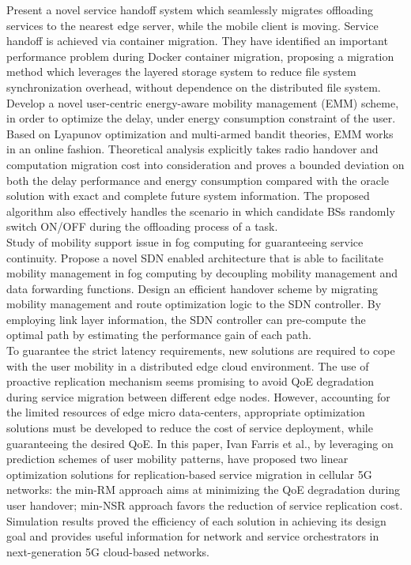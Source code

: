 \cite{ma2017efficient}
Present a novel service handoff system which seamlessly migrates offloading services to the nearest edge server, while the mobile client is moving. Service handoff is achieved via container migration. They have identified an important performance problem during Docker container migration, proposing a migration method which leverages the layered storage system to reduce file system synchronization overhead, without dependence on the distributed file system.\\
\cite{sun2017emm}
Develop a novel user-centric energy-aware mobility management (EMM) scheme, in order to optimize the delay, under energy consumption constraint of the user. Based on Lyapunov optimization and multi-armed bandit theories, EMM works in an online fashion. Theoretical analysis explicitly takes radio handover and computation migration cost into consideration and proves a bounded deviation on both the delay performance and energy consumption compared with the oracle solution with exact and complete future system information. The proposed algorithm also effectively handles the scenario in which candidate BSs randomly switch ON/OFF during the offloading process of a task.\\
\cite{bi2018mobility}
Study of mobility support issue in fog computing for guaranteeing service continuity. Propose a novel SDN enabled architecture that is able to facilitate mobility management in fog computing by decoupling mobility management and data forwarding functions. Design an efficient handover scheme by migrating mobility management and route optimization logic to the SDN controller. By employing link layer information, the SDN controller can pre-compute the optimal path by estimating the performance gain of each path.\\
\cite{farris2017optimizing}
To guarantee the strict latency requirements, new solutions are required to cope with the user mobility in a distributed edge cloud environment. The use of proactive replication mechanism seems promising to avoid QoE degradation during service migration between different edge nodes. However, accounting for the limited resources of edge micro data-centers, appropriate optimization solutions must be developed to reduce the cost of service deployment, while guaranteeing the desired QoE. In this paper, Ivan Farris et al., by leveraging on prediction schemes of user mobility patterns, have proposed two linear optimization solutions for replication-based service migration in cellular 5G networks: the min-RM approach aims at minimizing the QoE degradation during user handover; min-NSR approach favors the reduction of service replication cost. Simulation results proved the efficiency of each solution in achieving its design goal and provides useful information for network and service orchestrators in next-generation 5G cloud-based networks.
